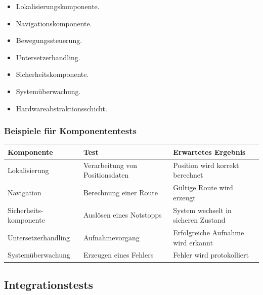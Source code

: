 \begin{itemize}
\tightlist
\item
  Lokalisierungskomponente.
\item
  Navigationskomponente.
\item
  Bewegungssteuerung.
\item
  Untersetzerhandling.
\item
  Sicherheitskomponente.
\item
  Systemüberwachung.
\item
  Hardwareabstraktionsschicht.
\end{itemize}

\subsubsection{Beispiele für
Komponententests}\label{beispiele-fuxfcr-komponententests}

\begin{longtable}[]{@{}
  >{\raggedright\arraybackslash}p{}
  >{\raggedright\arraybackslash}p{}
  >{\raggedright\arraybackslash}p{}@{}}
\toprule\noalign{}
\begin{minipage}[b]{\linewidth}\raggedright
Komponente
\end{minipage} & \begin{minipage}[b]{\linewidth}\raggedright
Test
\end{minipage} & \begin{minipage}[b]{\linewidth}\raggedright
Erwartetes Ergebnis
\end{minipage} \\
\midrule\noalign{}
\endhead
\bottomrule\noalign{}
\endlastfoot
Lokalisierung & Verarbeitung von Positionsdaten & Position wird korrekt
berechnet \\
Navigation & Berechnung einer Route & Gültige Route wird erzeugt \\
Sicherheits-komponente & Auslösen eines Notstopps & System wechselt in
sicheren Zustand \\
Untersetzerhandling & Aufnahmevorgang & Erfolgreiche Aufnahme wird
erkannt \\
Systemüberwachung & Erzeugen eines Fehlers & Fehler wird
protokolliert \\
\end{longtable}

\subsection{Integrationstests}\label{integrationstests-1}

